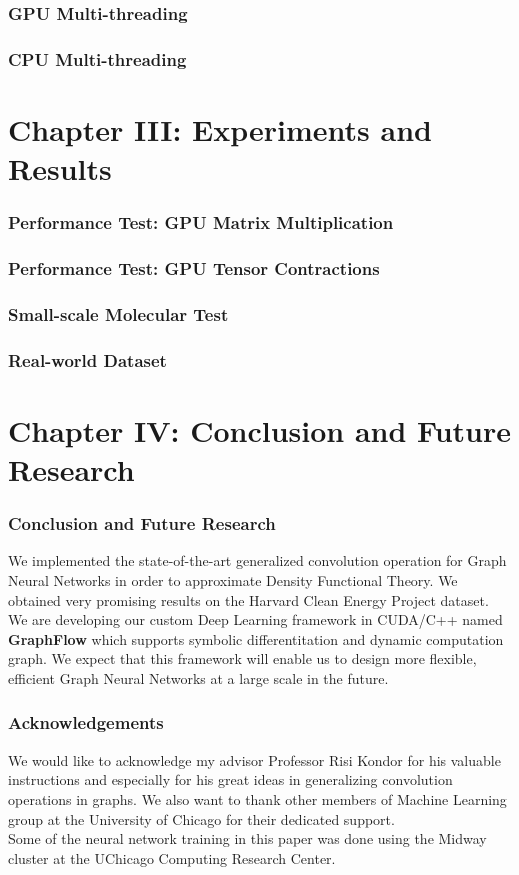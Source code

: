 \documentclass{beamer}
\begin{document}
\begin{frame}
\frametitle{GPU Multi-threading}
\end{frame}

\begin{frame}
\frametitle{CPU Multi-threading}
\end{frame}

\section{Chapter III: Experiments and Results}

\begin{frame}
\frametitle{Performance Test: GPU Matrix Multiplication}
\end{frame}

\begin{frame}
\frametitle{Performance Test: GPU Tensor Contractions}
\end{frame}

\begin{frame}
\frametitle{Small-scale Molecular Test}
\end{frame}

\begin{frame}
\frametitle{Real-world Dataset}
\end{frame}

\section{Chapter IV: Conclusion and Future Research}

\begin{frame}
\frametitle{Conclusion and Future Research}
\begin{justify}
We implemented the state-of-the-art generalized convolution operation for Graph Neural Networks in order to approximate Density Functional Theory. We obtained very promising results on the Harvard Clean Energy Project dataset.
$$$$
We are developing our custom Deep Learning framework in CUDA/C++ named \textbf{GraphFlow} which supports symbolic differentitation and dynamic computation graph. We expect that this framework will enable us to design more flexible, efficient Graph Neural Networks at a large scale in the future.
\end{justify}
\end{frame}

\begin{frame}
\frametitle{Acknowledgements}
\begin{justify}
We would like to acknowledge my advisor Professor Risi Kondor for his valuable instructions and especially for his great ideas in generalizing convolution operations in graphs. We also want to thank other members of Machine Learning group at the University of Chicago for their dedicated support.
$$$$
Some of the neural network training in this paper was done using the Midway cluster at the UChicago Computing Research Center.
\end{justify}
\end{frame}
\end{document}
